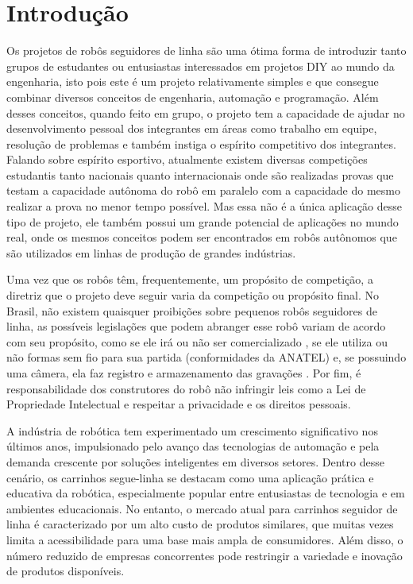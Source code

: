 \documentclass[
  12pt, %
  openright, %
  twoside, %
  a4paper, %
  english, %
  french, %
  spanish, %
  brazil %
]{abntex2}
\begin{document}
%
%
\tableofcontents*
\cleardoublepage

\textual

\chapter{Introdução}

Os projetos de robôs seguidores de linha são uma ótima forma de introduzir tanto
grupos de estudantes ou entusiastas interessados em projetos DIY ao mundo da
engenharia, isto pois este é um projeto relativamente simples e que consegue
combinar diversos conceitos de engenharia, automação e programação. Além desses
conceitos, quando feito em grupo, o projeto tem a capacidade de ajudar no
desenvolvimento pessoal dos integrantes em áreas como trabalho em equipe,
resolução de problemas e também instiga o espírito competitivo dos integrantes.
Falando sobre espírito esportivo, atualmente existem diversas competições
estudantis tanto nacionais quanto internacionais onde são realizadas provas que
testam a capacidade autônoma do robô em paralelo com a capacidade do mesmo
realizar a prova no menor tempo possível. Mas essa não é a única aplicação desse
tipo de projeto, ele também possui um grande potencial de aplicações no mundo
real, onde os mesmos conceitos podem ser encontrados em robôs autônomos que são
utilizados em linhas de produção de grandes indústrias.

Uma vez que os robôs têm, frequentemente, um propósito de competição, a diretriz
que o projeto deve seguir varia da competição ou propósito final. No Brasil, não
existem quaisquer proibições sobre pequenos robôs seguidores de linha, as
possíveis legislações que podem abranger esse robô variam de acordo com seu
propósito, como se ele irá ou não ser comercializado \cite{Lei:8078:1990}, se
ele utiliza ou não formas sem fio para sua partida (conformidades da ANATEL) e,
se possuindo uma câmera, ela faz registro e armazenamento das gravações
\cite{Lei:12651:2012}. Por fim, é responsabilidade dos construtores do robô não
infringir leis como a Lei de Propriedade Intelectual \cite{Lei:9279:1996} e
respeitar a privacidade e os direitos pessoais.

A indústria de robótica tem experimentado um crescimento significativo nos
últimos anos, impulsionado pelo avanço das tecnologias de automação e pela
demanda crescente por soluções inteligentes em diversos setores. Dentro desse
cenário, os carrinhos segue-linha se destacam como uma aplicação prática e
educativa da robótica, especialmente popular entre entusiastas de tecnologia e
em ambientes educacionais. No entanto, o mercado atual para carrinhos
seguidor de linha é caracterizado por um alto custo de produtos similares, que
muitas vezes limita a acessibilidade para uma base mais ampla de consumidores.
Além disso, o número reduzido de empresas concorrentes pode restringir a
variedade e inovação de produtos disponíveis.
\end{document}
